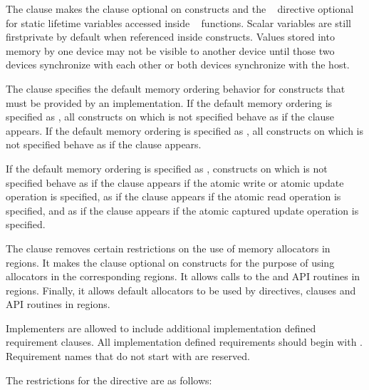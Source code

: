 The  clause makes the  clause optional
on  constructs and the ~
directive optional for static lifetime variables accessed inside
~ functions.  Scalar variables are still
firstprivate by default when referenced inside  constructs.  Values stored into
memory by one device may not be visible to another device until those two
devices synchronize with each other or both devices synchronize with the host.

The  clause specifies the default memory ordering
behavior for  constructs that must be provided by an
implementation. If the default memory ordering is specified as , all
 constructs on which  is not specified
behave as if the  clause appears. If the default memory
ordering is specified as , all  constructs on which
 is not specified behave as if the 
clause appears.

If the default memory ordering is specified as , 
constructs on which  is not specified behave as if
the  clause appears if the atomic write or atomic update
operation is specified, as if the  clause appears if the atomic
read operation is specified, and as if the  clause appears if
the atomic captured update operation is specified.

The  clause removes certain restrictions on the use
of memory allocators in  regions. It makes the
 clause optional on  constructs for the
purpose of using allocators in the corresponding  regions. It
allows calls to the  and 
API routines in  regions. Finally, it allows default allocators
to be used by  directives,  clauses and
 API routines in  regions.

Implementers are allowed to include additional implementation defined
requirement clauses.  All implementation defined requirements should begin with
.  Requirement names that do not start with  are
reserved.

\restrictions

The restrictions for the  directive are as follows:

